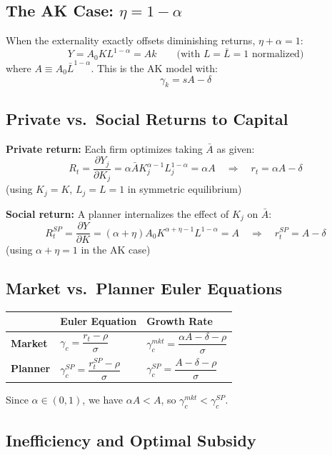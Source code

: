 \documentclass[a4paper,11pt]{article}
\begin{document}
\subsection*{The AK Case: $\eta = 1 - \alpha$}

When the externality exactly offsets diminishing returns, $\eta + \alpha = 1$:
\[
Y = A_0 K L^{1-\alpha} = A k \qquad \text{(with } L = \bar{L} = 1\text{ normalized)}
\]
where $A \equiv A_0 \bar{L}^{1-\alpha}$. This is the AK model with:
\[
\gamma_k = sA - \delta
\]

\subsection*{Private vs.\ Social Returns to Capital}

\textbf{Private return:} Each firm optimizes taking $\bar{A}$ as given:
\[
R_t = \frac{\partial Y_j}{\partial K_j} = \alpha \bar{A} K_j^{\alpha-1} L_j^{1-\alpha} = \alpha A \quad \Rightarrow \quad r_t = \alpha A - \delta
\]
(using $K_j = K$, $L_j = L = 1$ in symmetric equilibrium)

\textbf{Social return:} A planner internalizes the effect of $K_j$ on $\bar{A}$:
\[
R_t^{SP} = \frac{\partial Y}{\partial K} = (\alpha + \eta) A_0 K^{\alpha+\eta-1} L^{1-\alpha} = A \quad \Rightarrow \quad r_t^{SP} = A - \delta
\]
(using $\alpha + \eta = 1$ in the AK case)

\subsection*{Market vs.\ Planner Euler Equations}

\begin{center}
\begin{tabular}{lll}
\toprule
 & Euler Equation & Growth Rate \\
\midrule
\textbf{Market} & $\gamma_c = \dfrac{r_t - \rho}{\sigma}$ & $\boxed{\gamma_c^{mkt} = \dfrac{\alpha A - \delta - \rho}{\sigma}}$ \\[12pt]
\textbf{Planner} & $\gamma_c^{SP} = \dfrac{r_t^{SP} - \rho}{\sigma}$ & $\boxed{\gamma_c^{SP} = \dfrac{A - \delta - \rho}{\sigma}}$ \\
\bottomrule
\end{tabular}
\end{center}

Since $\alpha \in (0,1)$, we have $\alpha A < A$, so $\gamma_c^{mkt} < \gamma_c^{SP}$.

\subsection*{Inefficiency and Optimal Subsidy}
\end{document}
